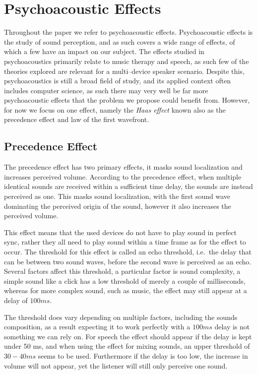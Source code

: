 \section{Psychoacoustic Effects}
Throughout the paper we refer to psychoacoustic effects.
Psychoacoustic effects is the study of sound perception, and as such covers a wide range of effects, of which a few have an impact on our subject.
The effects studied in psychoacoustics primarily relate to music therapy and speech, as such few of the theories explored are relevant for a multi--device speaker scenario. 
Despite this, psychoacoustics is still a broad field of study, and its applied context often includes computer science, as such there may very well be far more psychoacoustic effects that the problem we propose could benefit from. 
However, for now we focus on one effect, namely the \textit{Haas effect} known also as the precedence effect and law of the first wavefront.

\subsection{Precedence Effect}
The precedence effect has two primary effects, it masks sound localization and increases perceived volume.
According to the precedence effect, when multiple identical sounds are received within a sufficient time delay, the sounds are instead perceived as one.
This masks sound localization, with the first sound wave dominating the perceived origin of the sound, however it also increases the perceived volume.

This effect means that the used devices do not have to play sound in perfect sync, rather they all need to play sound within a time frame as for the effect to occur.
The threshold for this effect is called an echo threshold, i.e.~the delay that can be between two sound waves, before the second wave is perceived as an echo.
Several factors affect this threshold, a particular factor is sound complexity, a simple sound like a click has a low threshold of merely a couple of milliseconds, whereas for more complex sound, such as music, the effect may still appear at a delay of $100 ms$.\cite{precedence_wiki}

The threshold does vary depending on multiple factors, including the sounds composition, as a result expecting it to work perfectly with a $100 ms$ delay is not something we can rely on.
For speech the effect should appear if the delay is kept under 50 ms, and when using the effect for mixing sounds, an upper threshold of $30 - 40 ms$ seems to be used.
Furthermore if the delay is too low, the increase in volume will not appear, yet the listener will still only perceive one sound.\cite{useprecedence1}\cite{useprecedence2}\cite{useprecedence3}

